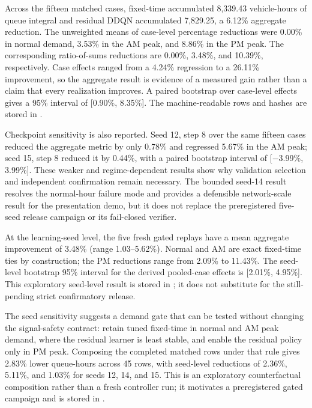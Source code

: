 \documentclass[12pt,a4paper]{report}
\begin{document}
Across the fifteen matched cases, fixed-time accumulated 8,339.43
vehicle-hours of queue integral and residual DDQN accumulated 7,829.25, a
6.12\% aggregate reduction. The unweighted means of case-level percentage reductions were 0.00\% in normal demand,
3.53\% in the AM peak, and 8.86\% in the PM peak. The corresponding
ratio-of-sums reductions are 0.00\%, 3.48\%, and 10.39\%, respectively. Case effects ranged from a
4.24\% regression to a 26.11\% improvement, so the aggregate result is
evidence of a measured gain rather than a claim that every realization
improves. A paired bootstrap over case-level effects gives a 95\% interval of
[0.90\%, 8.35\%]. The machine-readable rows and hashes are stored in
.

Checkpoint sensitivity is also reported. Seed 12, step 8 over the same fifteen
cases reduced the aggregate metric by only 0.78\% and regressed 5.67\% in the
AM peak; seed 15, step 8 reduced it by 0.44\%, with a paired bootstrap interval
of [$-$3.99\%, 3.99\%]. These weaker and regime-dependent results show why validation selection and
independent confirmation remain necessary. The bounded seed-14 result resolves the
normal-hour failure mode and provides a defensible network-scale result for the
presentation demo, but it does not replace the preregistered five-seed release
campaign or its fail-closed verifier.

At the learning-seed level, the five fresh gated replays have a mean aggregate
improvement of 3.48\% (range 1.03--5.62\%). Normal and AM are exact fixed-time
ties by construction; the PM reductions range from 2.09\% to 11.43\%.
The seed-level bootstrap 95\% interval for the derived pooled-case effects is
[2.01\%, 4.95\%]. This exploratory seed-level result is stored in
;
it does not substitute for the still-pending strict confirmatory release.

The seed sensitivity suggests a demand gate that can be tested without
changing the signal-safety contract: retain tuned fixed-time in normal and AM
peak demand, where the residual learner is least stable, and enable the
residual policy only in PM peak. Composing the completed matched rows under
that rule gives 2.83\% lower queue-hours across 45 rows, with seed-level
reductions of 2.36\%, 5.11\%, and 1.03\% for seeds 12, 14, and 15. This is an
exploratory counterfactual composition rather than a fresh controller run; it
motivates a preregistered gated campaign and is stored in
.
\end{document}
